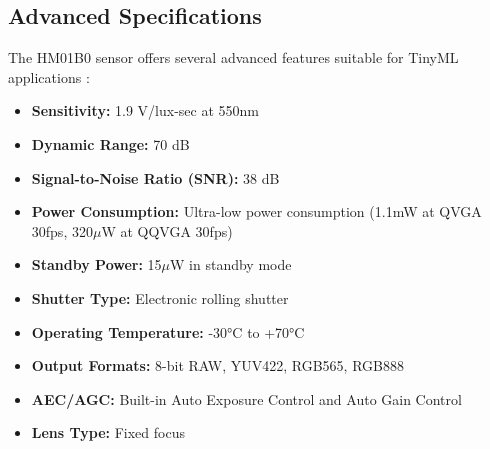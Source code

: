 \subsection{Advanced Specifications}



The HM01B0 sensor offers several advanced features suitable for TinyML applications \cite{Himax:2019}:



\begin{itemize}
    
    
    
    \item \textbf{Sensitivity:} 1.9 V/lux-sec at 550nm
    
    
    
    \item \textbf{Dynamic Range:} 70 dB
    
    
    
    \item \textbf{Signal-to-Noise Ratio (SNR):} 38 dB
    
    
    
    \item \textbf{Power Consumption:} Ultra-low power consumption (1.1mW at QVGA 30fps, 320$\mu$W at QQVGA 30fps)
    
    
    
    \item \textbf{Standby Power:} 15$\mu$W in standby mode
    
    
    
    \item \textbf{Shutter Type:} Electronic rolling shutter
    
    
    
    \item \textbf{Operating Temperature:} -30°C to +70°C
    
    
    
    \item \textbf{Output Formats:} 8-bit RAW, YUV422, RGB565, RGB888
    
    
    
    \item \textbf{AEC/AGC:} Built-in Auto Exposure Control and Auto Gain Control
    
    
    
    \item \textbf{Lens Type:} Fixed focus
    
    
    
\end{itemize}











